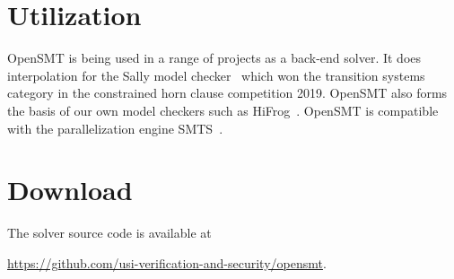 \documentclass{article}
\begin{document}
\section{Utilization}

OpenSMT is being used in a range of projects as a back-end solver.  It
does interpolation for the Sally model checker~\cite{JovanovicD:FMCAD16}
which won the transition systems category in the constrained horn clause
competition 2019.  OpenSMT also forms the basis of our own model
checkers such as HiFrog~\cite{AltACMFHS17}.  OpenSMT is compatible with
the parallelization engine SMTS~\cite{MarescottiHS18}.

\section{Download}
The solver source code is available at

\url{https://github.com/usi-verification-and-security/opensmt}.

\iffalse
in chronological order, work on interpolation 
algorithms~\cite{BlichaHKS19,AltHAS17,JancikAFHKS16,AsadiBFHESC18}
and parallel SMT 
solving~\cite{HyvarinenMSCS18,MarescottiHS18,HyvarinenMS:SAT15}.
OpenSMT2 is
used as the back-end in model-checking tools
HiFrog~\cite{AltACMFHS17},
eVolCheck~\cite{FSS_TACAS13}, 
FunFrog~\cite{SFS_ATVA12}, and
PeRIPLO~\cite{RolliniAFHS:LPAR2013,AltFHS:VSTTE2015}.
OpenSMT2 is a supported engine in the parallel 
solving framework SMTS~\cite{MarescottiHS16}.

\section{Acknowledgements}
We thank everyone who helped
developing OpenSMT2. In particular,
Leonardo Alt,
Sepideh Asadi,
Martin Blicha,
Roberto Bruttomesso,
Antti E. J. Hyv{\"a}rinen,
Matteo Marescotti,
Edgar Pek,
Simone Fulvio Rollini, 
Parvin Sadigova,
Natasha Sharygina,
Aliaksei Tsitovich.
\fi



\end{document}
